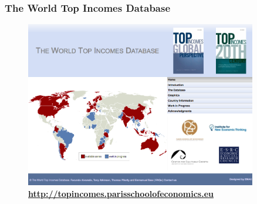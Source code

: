 \documentclass[t]{beamer}\usepackage[]{graphicx}\usepackage[]{color}
\begin{document}
\begin{frame}[label=WTID]
\frametitle{The World Top Incomes Database}
\begin{figure}[t]
\begin{minipage}[b]{\textwidth}
\centering
\includegraphics[width=0.9\textwidth]
{pictures/WorldTopIncomesDatabase}
\caption{\textbf{\url{http://topincomes.parisschoolofeconomics.eu}}}
\end{minipage}
\end{figure}
\end{frame}
\end{document}
